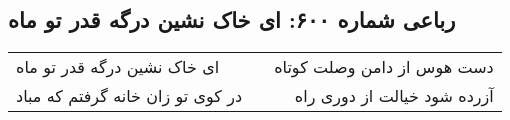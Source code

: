 \begin{center}
\section*{رباعی شماره ۶۰۰: ای خاک نشین درگه قدر تو ماه}
\label{sec:sh600}
\begin{longtable}{l p{0.5cm} r}
ای خاک نشین درگه قدر تو ماه
&&
دست هوس از دامن وصلت کوتاه
\\
در کوی تو زان خانه گرفتم که مباد
&&
آزرده شود خیالت از دوری راه
\\
\end{longtable}
\end{center}
